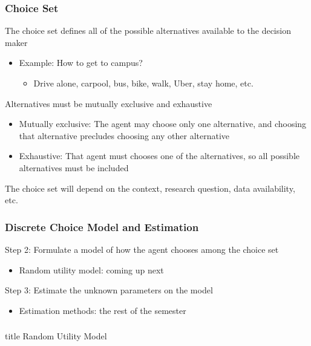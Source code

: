 \documentclass{beamer}
\begin{document}
\begin{frame}\frametitle{Choice Set}
    The choice set defines all of the possible alternatives available to the decision maker
    \begin{itemize}
    	\item Example: How to get to campus?
    	\begin{itemize}
    		\item Drive alone, carpool, bus, bike, walk, Uber, stay home, etc.
    	\end{itemize}
    \end{itemize}
    \vspace{2ex}
    Alternatives must be mutually exclusive and exhaustive
    \begin{itemize}
    	\item Mutually exclusive: The agent may choose only one alternative, and choosing that alternative precludes choosing any other alternative
    	\item Exhaustive: That agent must chooses one of the alternatives, so all possible alternatives must be included
    \end{itemize}
    \vspace{2ex}
    The choice set will depend on the context, research question, data availability, etc.
\end{frame}

\begin{frame}\frametitle{Discrete Choice Model and Estimation}
    Step 2: Formulate a model of how the agent chooses among the choice set \\
    \begin{itemize}
    	\item Random utility model: coming up next
    \end{itemize}
    \vspace{3ex}
    Step 3: Estimate the unknown parameters on the model
    \begin{itemize}
    	\item Estimation methods: the rest of the semester
    \end{itemize}
\end{frame}

\begin{frame}\frametitle{}
    \vfill
    \centering
    \begin{beamercolorbox}[center]{title}
        \Large Random Utility Model
    \end{beamercolorbox}
    \vfill
\end{frame}
\end{document}
